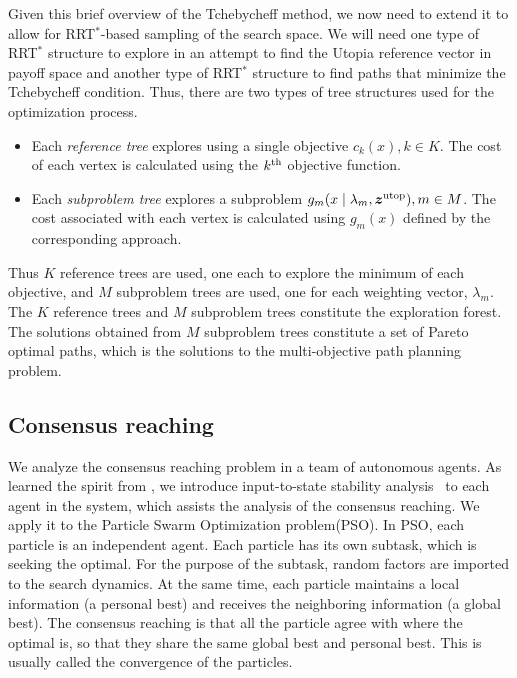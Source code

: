 \documentclass[phd]{byuprop}
\begin{document}
Given this brief overview of the Tchebycheff method, we now need to extend it to allow for RRT$^{*}$-based sampling of the search space.  
We will need one type of RRT$^{*}$ structure to explore in an attempt to find the Utopia reference vector in payoff space and another type of RRT$^{*}$ structure to find paths that minimize the Tchebycheff condition. %
Thus, there are two types of tree structures used for the optimization process.
\begin{itemize}
\item Each \emph{reference tree} explores using a single objective $ c_{k} (x), k \in K $. 
The cost of each vertex is calculated using the $ k^{\rm th} $ objective function.
\item Each \emph{subproblem tree} explores a subproblem $ g_{m} ( x \mid \lambda_{m} , \bm{z}^{\rm utop} ) , m \in M $.
The cost associated with each vertex is calculated using $ g_{m}(x) $ defined by the corresponding approach.
\end{itemize}
Thus $ K $ reference trees are used, one each to explore the minimum of each objective, and $ M $ subproblem trees are used, one for each weighting vector, $ \lambda_{m} $.  
The $K$ reference trees and $M$ subproblem trees constitute the exploration forest.
The solutions obtained from $ M $ subproblem trees constitute a set of Pareto optimal paths, which is the solutions to the multi-objective path planning problem. 

\subsection{Consensus reaching}

We analyze the consensus reaching problem in a team of autonomous agents.
As learned the spirit from \cite{1470210}, we introduce input-to-state stability analysis~\cite{Jiang2001} to each agent in the system, which assists the analysis of the consensus reaching.
We apply it to the Particle Swarm Optimization problem(PSO).
In PSO, each particle is an independent agent.
Each particle has its own subtask, which is seeking the optimal.
For the purpose of the subtask, random factors are imported to the search dynamics.
At the same time, each particle maintains a local information (a personal best) and receives the neighboring information (a global best).
The consensus reaching is that all the particle agree with where the optimal is, so that they share the same global best and personal best.
This is usually called the convergence of the particles.
\end{document}

